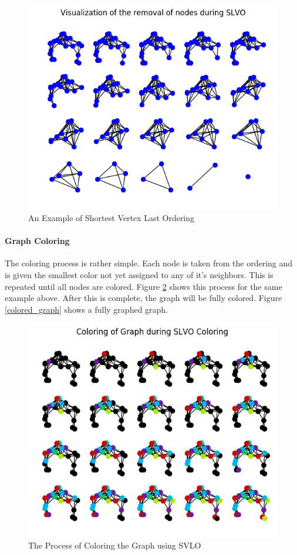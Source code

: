 \documentclass{article}
\begin{document}
    \begin{figure}
      \centering
      \label{ordering_graph}
      \includegraphics[width=1 \textwidth]{walkthrough/ordering}
      \caption{An Example of Shortest Vertex Last Ordering}
    \end{figure}

    \paragraph{Graph Coloring}
    The coloring process is rather simple.
    Each node is taken from the ordering and is given the smallest color not yet assigned to any of it's neighbors.
    This is repeated until all nodes are colored.
    Figure \ref{coloring_graph} shows this process for the same example above.
    After this is complete, the graph will be fully colored.
    Figure \ref{colored_graph} shows a fully graphed graph.

    \begin{figure}
      \centering
      \label{coloring_graph}
      \includegraphics[width=1 \textwidth]{walkthrough/coloring}
      \caption{The Process of Coloring the Graph using SVLO}
    \end{figure}
\end{document}
